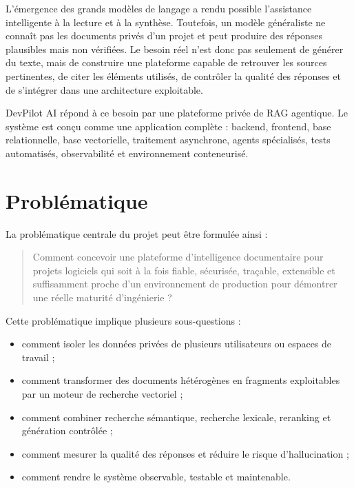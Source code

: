 \documentclass[12pt,a4paper,oneside]{report}
\begin{document}
L'émergence des grands modèles de langage a rendu possible l'assistance intelligente à la lecture et à la synthèse. Toutefois, un modèle généraliste ne connaît pas les documents privés d'un projet et peut produire des réponses plausibles mais non vérifiées. Le besoin réel n'est donc pas seulement de générer du texte, mais de construire une plateforme capable de retrouver les sources pertinentes, de citer les éléments utilisés, de contrôler la qualité des réponses et de s'intégrer dans une architecture exploitable.

DevPilot AI répond à ce besoin par une plateforme privée de RAG agentique. Le système est conçu comme une application complète : backend, frontend, base relationnelle, base vectorielle, traitement asynchrone, agents spécialisés, tests automatisés, observabilité et environnement conteneurisé.

\section{Problématique}
La problématique centrale du projet peut être formulée ainsi :

\begin{quote}
Comment concevoir une plateforme d'intelligence documentaire pour projets logiciels qui soit à la fois fiable, sécurisée, traçable, extensible et suffisamment proche d'un environnement de production pour démontrer une réelle maturité d'ingénierie ?
\end{quote}

Cette problématique implique plusieurs sous-questions :
\begin{itemize}
  \item comment isoler les données privées de plusieurs utilisateurs ou espaces de travail ;
  \item comment transformer des documents hétérogènes en fragments exploitables par un moteur de recherche vectoriel ;
  \item comment combiner recherche sémantique, recherche lexicale, reranking et génération contrôlée ;
  \item comment mesurer la qualité des réponses et réduire le risque d'hallucination ;
  \item comment rendre le système observable, testable et maintenable.
\end{itemize}
\end{document}
